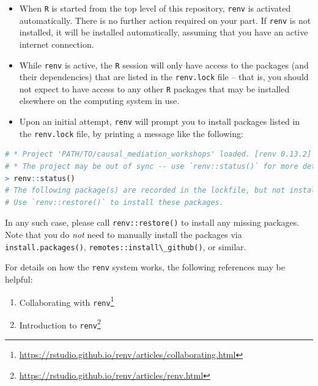 \documentclass[
  12pt,
]{book}
\newcommand{\passthrough}[1]{#1}
\providecommand{\tightlist}{%
  \setlength{\itemsep}{0pt}\setlength{\parskip}{0pt}}
\renewcommand{\href}[2]{#2\footnote{\url{#1}}}
\theoremstyle{definition}
\theoremstyle{definition}
\theoremstyle{definition}
\newcommand{\1}{\mathbbm{1}}
\begin{document}
\begin{itemize}
\tightlist
\item
  When \passthrough{\lstinline!R!} is started from the top level of this repository, \passthrough{\lstinline!renv!} is
  activated automatically. There is no further action required on your part. If
  \passthrough{\lstinline!renv!} is not installed, it will be installed automatically, assuming that you
  have an active internet connection.
\item
  While \passthrough{\lstinline!renv!} is active, the \passthrough{\lstinline!R!} session will only have access to the packages
  (and their dependencies) that are listed in the \passthrough{\lstinline!renv.lock!} file -- that is,
  you should not expect to have access to any other \passthrough{\lstinline!R!} packages that may be
  installed elsewhere on the computing system in use.
\item
  Upon an initial attempt, \passthrough{\lstinline!renv!} will prompt you to install packages listed in
  the \passthrough{\lstinline!renv.lock!} file, by printing a message like the following:
\end{itemize}

\begin{lstlisting}[language=R]
# * Project 'PATH/TO/causal_mediation_workshops' loaded. [renv 0.13.2]
# * The project may be out of sync -- use `renv::status()` for more details.
> renv::status()
# The following package(s) are recorded in the lockfile, but not installed:
# Use `renv::restore()` to install these packages.
\end{lstlisting}

In any such case, please call \passthrough{\lstinline!renv::restore()!} to install any missing packages.
Note that you do \emph{not} need to manually install the packages via
\passthrough{\lstinline!install.packages()!}, \passthrough{\lstinline!remotes::install\_github()!}, or similar.

For details on how the \passthrough{\lstinline!renv!} system works, the following references may be
helpful:

\begin{enumerate}
\def\labelenumi{\arabic{enumi}.}
\tightlist
\item
  \href{https://rstudio.github.io/renv/articles/collaborating.html}{Collaborating with
  \passthrough{\lstinline!renv!}}
\item
  \href{https://rstudio.github.io/renv/articles/renv.html}{Introduction to \passthrough{\lstinline!renv!}}
\end{enumerate}
\end{document}
